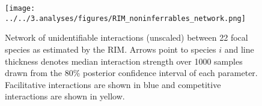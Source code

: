 \documentclass[a4,12pt]{article}
\begin{document}
    \begin{figure}[H]
        \texttt{[image: ../../3.analyses/figures/RIM\_noninferrables\_network.png]}
        \caption{Network of unidentifiable interactions (unscaled) between 22 focal species as estimated by the RIM. Arrows point to species $i$ and line thickness denotes median interaction strength over 1000 samples drawn from the 80\% posterior confidence interval of each parameter. Facilitative interactions are shown in blue and competitive interactions are shown in yellow.}
        \label{fig:jointnetwork}
    \end{figure}
\end{document}
